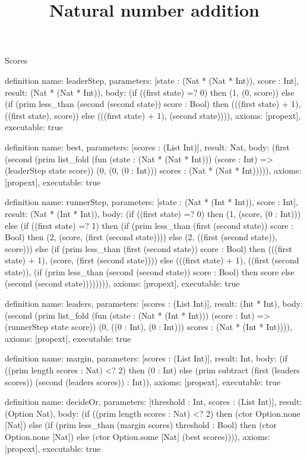 \begin{lexlean}{Scores}
\title{Natural number addition}
\begin{semanticmodule}
definition{
  name: leaderStep,
  parameters: [state : (Nat * (Nat * Int)), score : Int],
  result: (Nat * (Nat * Int)),
  body: (if ((first state) =? 0) then (1, (0, score)) else (if (prim less_than (second (second state)) score : Bool) then (((first state) + 1), ((first state), score)) else (((first state) + 1), (second state)))),
  axioms: [propext],
  executable: true
}

definition{
  name: best,
  parameters: [scores : (List Int)],
  result: Nat,
  body: (first (second (prim list_fold (fun (state : (Nat * (Nat * Int))) (score : Int) => (leaderStep state score)) (0, (0, (0 : Int))) scores : (Nat * (Nat * Int))))),
  axioms: [propext],
  executable: true
}

definition{
  name: runnerStep,
  parameters: [state : (Nat * (Int * Int)), score : Int],
  result: (Nat * (Int * Int)),
  body: (if ((first state) =? 0) then (1, (score, (0 : Int))) else (if ((first state) =? 1) then (if (prim less_than (first (second state)) score : Bool) then (2, (score, (first (second state)))) else (2, ((first (second state)), score))) else (if (prim less_than (first (second state)) score : Bool) then (((first state) + 1), (score, (first (second state)))) else (((first state) + 1), ((first (second state)), (if (prim less_than (second (second state)) score : Bool) then score else (second (second state)))))))),
  axioms: [propext],
  executable: true
}

definition{
  name: leaders,
  parameters: [scores : (List Int)],
  result: (Int * Int),
  body: (second (prim list_fold (fun (state : (Nat * (Int * Int))) (score : Int) => (runnerStep state score)) (0, ((0 : Int), (0 : Int))) scores : (Nat * (Int * Int)))),
  axioms: [propext],
  executable: true
}

definition{
  name: margin,
  parameters: [scores : (List Int)],
  result: Int,
  body: (if ((prim length scores : Nat) <? 2) then (0 : Int) else (prim subtract (first (leaders scores)) (second (leaders scores)) : Int)),
  axioms: [propext],
  executable: true
}

definition{
  name: decideOr,
  parameters: [threshold : Int, scores : (List Int)],
  result: (Option Nat),
  body: (if ((prim length scores : Nat) <? 2) then (ctor Option.none [Nat]) else (if (prim less_than (margin scores) threshold : Bool) then (ctor Option.none [Nat]) else (ctor Option.some [Nat] (best scores)))),
  axioms: [propext],
  executable: true
}


\end{semanticmodule}
\end{lexlean}
